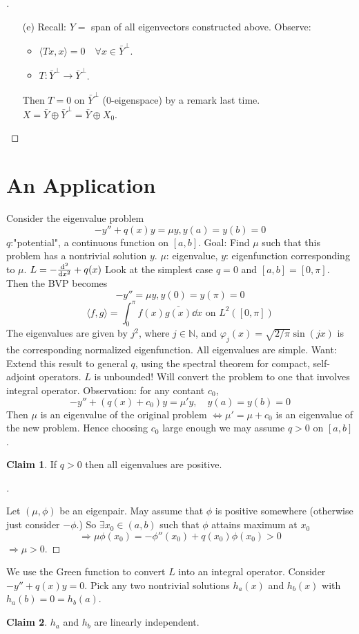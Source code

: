 \documentclass{article}
\theoremstyle{definition}
\newtheorem*{clm}{Claim}
\newenvironment{proofs}[1][\proofname]{%
  \begin{proof}[#1]$ $\par\nobreak\ignorespaces
}{%
  \end{proof}
}
\newcommand{\NN}{\mathbb N}
\begin{document}
\begin{proofs}
\begin{enumerate}
		\item[(e)] Recall: $Y = $ span of all eigenvectors constructed above.
			Observe: 
			\begin{itemize}
				\item $\langle T x, x \rangle = 0 \quad \forall x \in \bar{Y}^{\perp}$.

				\item $T: \bar{Y}^{\perp} \to \bar{Y}^{\perp}$.
			\end{itemize}
			Then $T = 0$ on $\bar{Y}^\perp$ (0-eigenspace) by a remark last time.
			$X = \bar{Y} \oplus \bar{Y}^\perp = \bar{Y} \oplus X_0$.
	\end{enumerate}
\end{proofs}

\section{An Application}

Consider the eigenvalue problem
\[
	-y'' + q(x) y = \mu y, y(a) = y(b) = 0
\]
$q$:"potential", a continuous function on $[a, b]$.
Goal: Find $\mu$ such that this problem has a nontrivial solution $y$.
$\mu$: eigenvalue, $y$: eigenfunction corresponding to $\mu$.
$L = -\dv[2]{x} + q(x)$
Look at the simplest case $q = 0$ and $[a, b] = [0, \pi]$.
Then the BVP becomes
\[
	-y'' = \mu y, y(0) = y(\pi) = 0
\]
\[
	\langle f, g \rangle = \int_0^\pi f(x) \overline{g(x)} \dd{x} \text{ on } L^2([0, \pi]) 
\]
The eigenvalues are given by $j^2$, where $j \in \NN$, and $\varphi_j(x) = \sqrt{2/\pi} \sin(jx)$ is the corresponding normalized eigenfunction.
All eigenvalues are simple.
Want: Extend this result to general $q$, using the spectral theorem for compact, self-adjoint operators.
$L$ is unbounded!
Will convert the problem to one that involves integral operator.
Observation: for any contant $c_0$, 
\[
	- y'' + (q(x) + c_0) y = \mu' y, \quad y(a) = y(b) = 0
\]
Then $\mu$ is an eigenvalue of the original problem $\Leftrightarrow \mu' = \mu + c_0$ is an eigenvalue of the new problem.
Hence choosing $c_0$ large enough we may assume $q > 0$ on $[a, b]$.
\begin{clm}
	If $q > 0$ then all eigenvalues are positive.
\end{clm}
\begin{proofs}
	Let $(\mu, \phi)$ be an eigenpair.
	May assume that $\phi$ is positive somewhere (otherwise just consider $- \phi$.)
	So $\exists x_0 \in (a, b)$ such that $\phi$ attains maximum at $x_0$
	\[
		\Rightarrow \mu \phi(x_0) = - \phi''(x_0) + q(x_0) \phi(x_0) > 0
	\]
	$\Rightarrow \mu > 0$.
\end{proofs}
We use the Green function to convert $L$ into an integral operator.
Consider $-y'' + q(x) y = 0$.
Pick any two nontrivial solutions $h_a(x)$ and $h_b(x)$ with $h_a(b) = 0 = h_b(a)$.
\begin{clm}
	$h_a$ and $h_b$ are linearly independent.
\end{clm}
\end{document}

